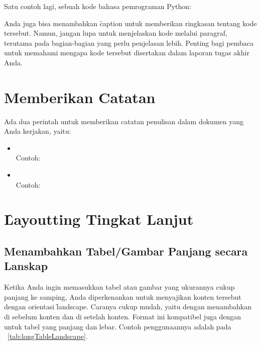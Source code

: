 Satu contoh lagi, sebuah kode bahasa pemrograman Python:


Anda juga bisa menambahkan \f{caption} untuk memberikan ringkasan tentang kode tersebut.
Namun, jangan lupa untuk menjelaskan kode melalui paragraf, terutama pada bagian-bagian yang perlu penjelasan lebih.
Penting bagi pembaca untuk memahami mengapa kode tersebut disertakan dalam laporan tugas akhir Anda.


\section{Memberikan Catatan}
\label{sec:note}
Ada dua perintah untuk memberikan catatan penulisan dalam dokumen yang Anda kerjakan, yaitu:
\begin{itemize}
	\item {} \\
	Contoh: \\ 
	\item {} \\
	Contoh: \todoCite
\end{itemize}


\section{\f{Layoutting} Tingkat Lanjut}
\label{sec:advancedLayoutting}

\subsection{Menambahkan Tabel/Gambar Panjang secara Lanskap}
\label{sec:landscape}
Ketika Anda ingin memasukkan tabel atau gambar yang ukurannya cukup panjang ke samping, Anda diperkenankan untuk menyajikan konten tersebut dengan orientasi \f{landscape}. Caranya cukup mudah, yaitu dengan menambahkan  di sebelum konten dan  di setelah konten. Format ini kompatibel juga dengan  untuk tabel yang panjang dan lebar. Contoh penggunaannya adalah pada \tab~\ref{tab:longTableLandscape}.

